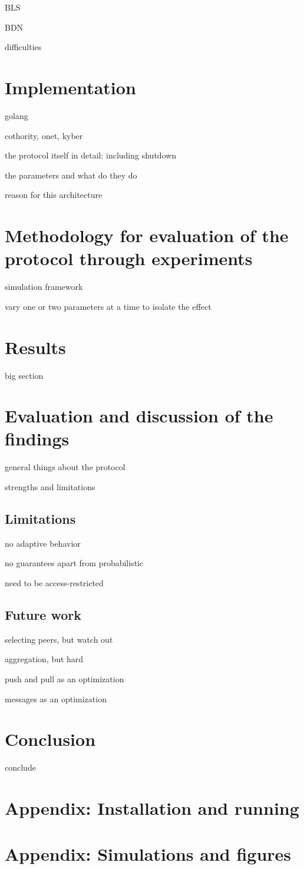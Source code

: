 BLS

BDN

difficulties


\section{Implementation}

golang

cothority, onet, kyber

the protocol itself in detail: including shutdown

the parameters and what do they do

reason for this architecture


\section{Methodology for evaluation of the protocol through experiments}

simulation framework

vary one or two parameters at a time to isolate the effect


\section{Results}

big section


\section{Evaluation and discussion of the findings}

general things about the protocol

strengths and limitations


\subsection{Limitations}

no adaptive behavior

no guarantees apart from probabilistic

need to be access-restricted


\subsection{Future work}

selecting peers, but watch out

aggregation, but hard

push and pull as an optimization

messages as an optimization


\section{Conclusion}

conclude


\newpage
\appendix


\section{Appendix: Installation and running}


\section{Appendix: Simulations and figures}


\raggedright


